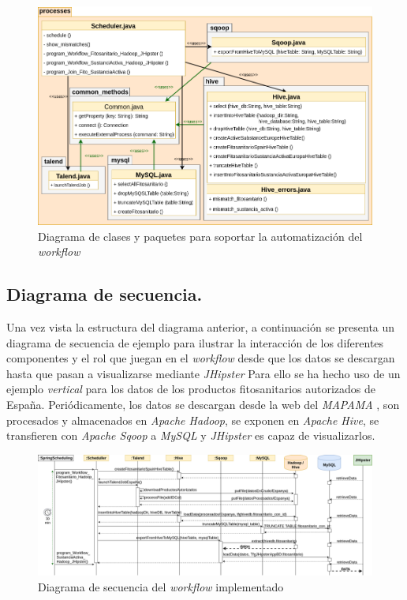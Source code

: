 \begin{figure}[H]
    \centering
    \includegraphics[width=\textwidth,height=\textheight,keepaspectratio]{Imagenes/clases}
    \caption{Diagrama de clases y paquetes para soportar la automatización del \textit{workflow}}
    \label{fig:diag_clases}
\end{figure}

\subsection{Diagrama de secuencia.} \label{disenyo.arquitectura.secuencia}
\par Una vez vista la estructura del diagrama anterior, a continuación se presenta un diagrama de secuencia de ejemplo para ilustrar la interacción de los diferentes componentes y el rol que juegan en el \textit{workflow} desde que los datos se descargan hasta que pasan a visualizarse mediante \textit{JHipster} Para ello se ha hecho uso de un ejemplo \textit{vertical} para los datos de los productos fitosanitarios autorizados de España. Periódicamente, los datos se descargan desde la web del \textit{MAPAMA} \cite{mapama}, son procesados y almacenados en \textit{Apache Hadoop}, se exponen en \textit{Apache Hive}, se transfieren con \textit{Apache Sqoop} a \textit{MySQL} y \textit{JHipster} es capaz de visualizarlos.

\begin{landscape}
\begin{figure}[p!]
    \includegraphics[width=\linewidth]{Imagenes/secuencia}
    \caption{Diagrama de secuencia del \textit{workflow} implementado}
    \label{fig:diag_secuencia_workflow}
\end{figure}
\end{landscape}
\bigskip


